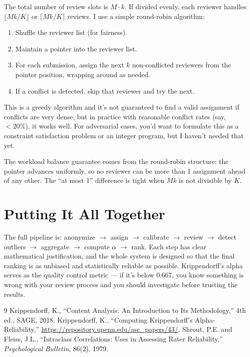 \documentclass[11pt]{article}
\begin{document}
The total number of review slots is $M \cdot k$. If divided evenly, each reviewer handles $\lfloor Mk / K \rfloor$ or $\lceil Mk / K \rceil$ reviews. I use a simple round-robin algorithm:

\begin{enumerate}
    \item Shuffle the reviewer list (for fairness).
    \item Maintain a pointer into the reviewer list.
    \item For each submission, assign the next $k$ non-conflicted reviewers from the pointer position, wrapping around as needed.
    \item If a conflict is detected, skip that reviewer and try the next.
\end{enumerate}

This is a greedy algorithm and it's not guaranteed to find a valid assignment if conflicts are very dense, but in practice with reasonable conflict rates (say, $<20\%$), it works well. For adversarial cases, you'd want to formulate this as a constraint satisfaction problem or an integer program, but I haven't needed that yet.

The workload balance guarantee comes from the round-robin structure: the pointer advances uniformly, so no reviewer can be more than 1 assignment ahead of any other. The ``at most 1'' difference is tight when $Mk$ is not divisible by $K$.

\section{Putting It All Together}

The full pipeline is: anonymize $\to$ assign $\to$ calibrate $\to$ review $\to$ detect outliers $\to$ aggregate $\to$ compute $\alpha$ $\to$ rank. Each step has clear mathematical justification, and the whole system is designed so that the final ranking is as unbiased and statistically reliable as possible. Krippendorff's alpha serves as the quality control metric --- if it's below 0.667, you know something is wrong with your review process and you should investigate before trusting the results.

\begin{thebibliography}{9}
 Krippendorff, K., ``Content Analysis: An Introduction to Its Methodology,'' 4th ed., SAGE, 2018.
 Krippendorff, K., ``Computing Krippendorff's Alpha-Reliability,'' \url{https://repository.upenn.edu/asc_papers/43/}.
 Shrout, P.E. and Fleiss, J.L., ``Intraclass Correlations: Uses in Assessing Rater Reliability,'' \textit{Psychological Bulletin}, 86(2), 1979.
\end{thebibliography}
\end{document}
